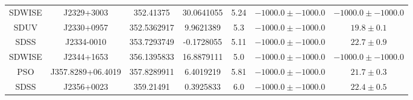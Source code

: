 \begin{table}
\begin{tabular}{ccccccc}
SDWISE & J2329+3003 & 352.41375 & 30.0641055 & 5.24 & $-1000.0\pm-1000.0$ & $-1000.0\pm-1000.0$ \\
SDUV & J2330+0957 & 352.5362917 & 9.9621389 & 5.3 & $-1000.0\pm-1000.0$ & $  19.8\pm  0.1$ \\
SDSS & J2334-0010 & 353.7293749 & -0.1728055 & 5.11 & $-1000.0\pm-1000.0$ & $  22.7\pm  0.9$ \\
SDWISE & J2344+1653 & 356.1395833 & 16.8879111 & 5.0 & $-1000.0\pm-1000.0$ & $-1000.0\pm-1000.0$ \\
PSO & J357.8289+06.4019 & 357.8289911 & 6.4019219 & 5.81 & $-1000.0\pm-1000.0$ & $  21.7\pm  0.3$ \\
SDSS & J2356+0023 & 359.21491 & 0.3925833 & 6.0 & $-1000.0\pm-1000.0$ & $  22.4\pm  0.5$ \\
\end{tabular}
\end{table}
